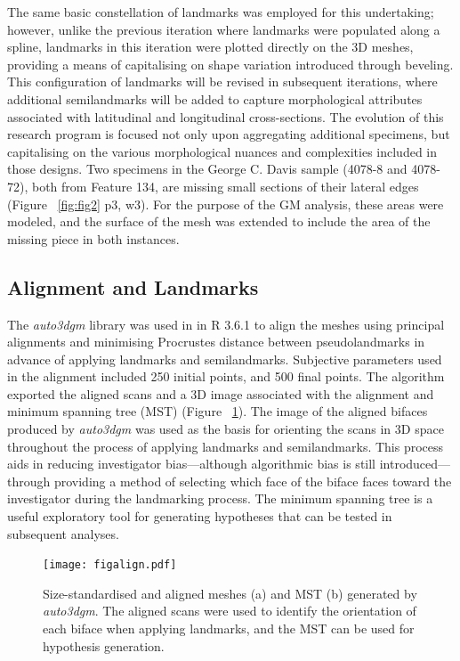 \documentclass[review]{elsarticle}
\begin{document}
The same basic constellation of landmarks was employed for this undertaking; however, unlike the previous iteration where landmarks were populated along a spline, landmarks in this iteration were plotted directly on the 3D meshes, providing a means of capitalising on shape variation introduced through beveling. This configuration of landmarks will be revised in subsequent iterations, where additional semilandmarks will be added to capture morphological attributes associated with latitudinal and longitudinal cross-sections. The evolution of this research program is focused not only upon aggregating additional specimens, but capitalising on the various morphological nuances and complexities included in those designs. Two specimens in the George C. Davis sample (4078-8 and 4078-72), both from Feature 134, are missing small sections of their lateral edges (Figure ~\ref{fig:fig2} p3, w3). For the purpose of the GM analysis, these areas were modeled, and the surface of the mesh was extended to include the area of the missing piece in both instances.

\subsection*{Alignment and Landmarks}

The \textit{auto3dgm} library \citep{RN20822} was used in in R 3.6.1 \citep{R} to align the meshes using principal alignments and minimising Procrustes distance between pseudolandmarks in advance of applying landmarks and semilandmarks. Subjective parameters used in the alignment included 250 initial points, and 500 final points. The algorithm exported the aligned scans and a 3D image associated with the alignment and minimum spanning tree (MST) (Figure ~\ref{fig:fig4}). The image of the aligned bifaces produced by \textit{auto3dgm} was used as the basis for orienting the scans in 3D space throughout the process of applying landmarks and semilandmarks. This process aids in reducing investigator bias---although algorithmic bias is still introduced---through providing a method of selecting which face of the biface faces toward the investigator during the landmarking process. The minimum spanning tree is a useful exploratory tool for generating hypotheses that can be tested in subsequent analyses.

\begin{figure}[ht]\centering
\texttt{[image: figalign.pdf]}
\caption{Size-standardised and aligned meshes (a) and MST (b) generated by \textit{auto3dgm}. The aligned scans were used to identify the orientation of each biface when applying landmarks, and the MST can be used for hypothesis generation.}
\label{fig:fig4}
\end{figure}
\end{document}
